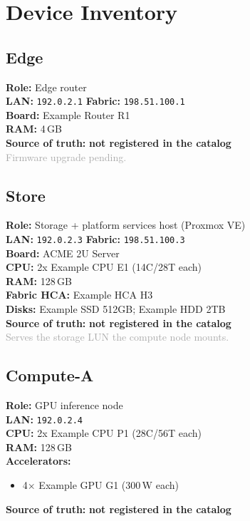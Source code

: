 \documentclass[11pt]{article}
\begin{document}
\section{Device Inventory}
\subsection{Edge}
\textbf{Role:} Edge router\\
\textbf{LAN:} \texttt{192.0.2.1} \quad \textbf{Fabric:} \texttt{198.51.100.1}\\
\textbf{Board:} Example Router R1\\
\textbf{RAM:} 4\,GB\\
\textbf{Source of truth:} \textcolor{accent}{\textbf{not registered in the catalog}}\\
\textcolor{darkgray}{Firmware upgrade pending.}
\subsection{Store}
\textbf{Role:} Storage + platform services host (Proxmox VE)\\
\textbf{LAN:} \texttt{192.0.2.3} \quad \textbf{Fabric:} \texttt{198.51.100.3}\\
\textbf{Board:} ACME 2U Server\\
\textbf{CPU:} 2x Example CPU E1 (14C/28T each)\\
\textbf{RAM:} 128\,GB\\
\textbf{Fabric HCA:} Example HCA H3\\
\textbf{Disks:} Example SSD 512GB; Example HDD 2TB\\
\textbf{Source of truth:} \textcolor{accent}{\textbf{not registered in the catalog}}\\
\textcolor{darkgray}{Serves the storage LUN the compute node mounts.}
\subsection{Compute-A}
\textbf{Role:} GPU inference node\\
\textbf{LAN:} \texttt{192.0.2.4}\\
\textbf{CPU:} 2x Example CPU P1 (28C/56T each)\\
\textbf{RAM:} 128\,GB\\
\textbf{Accelerators:}\begin{itemize}[nosep,leftmargin=1.4em]\item 4$\times$ Example GPU G1 (300\,W each)
\end{itemize}
\textbf{Source of truth:} \textcolor{accent}{\textbf{not registered in the catalog}}\\
\end{document}
